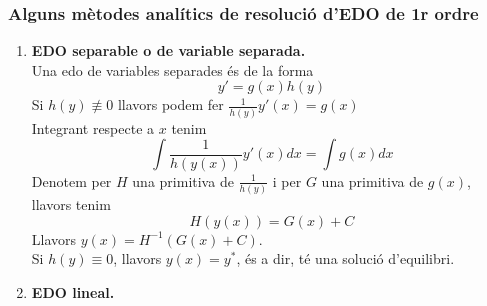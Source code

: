 \documentclass[../main.tex]{subfiles}
\begin{document}
\subsubsection{Alguns mètodes analítics de resolució d'EDO de 1r ordre}
\begin{enumerate}
    \item \textbf{EDO separable o de variable separada.}\\
    Una edo de variables separades és de la forma
    \begin{displaymath}
        y' = g\left(x\right) h\left(y\right)
    \end{displaymath}
    Si $h\left(y\right) \not\equiv 0$ llavors podem fer $\frac{1}{h\left(y\right)} y'\left(x\right) = g\left(x\right)$\\
    Integrant respecte a $x$ tenim
    \begin{displaymath}
        \int \frac{1}{h\left(y(x)\right)} y'(x) dx = \int g(x) dx
    \end{displaymath}
    Denotem per $H$ una primitiva de $\frac{1}{h\left(y\right)}$ i per $G$ una primitiva de $g(x)$,
    llavors tenim
    \begin{displaymath}
        H(y(x)) = G(x) + C
    \end{displaymath}
    Llavors $y(x) = H^{-1}\left(G(x)+C\right)$.\\
    Si $h\left(y\right) \equiv 0$, llavors $y(x) = y^*$, és a dir, té una solució d'equilibri.

    \item \textbf{EDO lineal.}\\


\end{enumerate}
\end{document}
